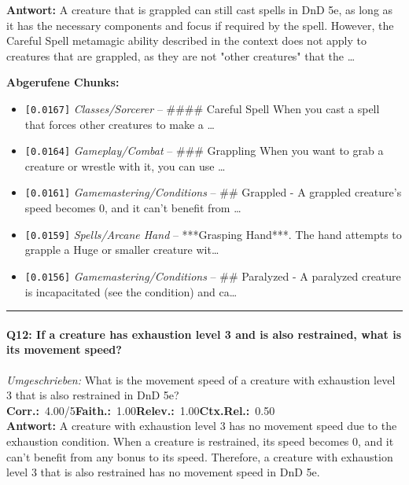 \noindent\textbf{Antwort:} A creature that is grappled can still cast spells in DnD 5e, as long as it has the necessary components and focus if required by the spell. However, the Careful Spell metamagic ability described in the context does not apply to creatures that are grappled, as they are not "other creatures" that the \ldots

\noindent\textbf{Abgerufene Chunks:}
\begin{itemize}[noitemsep, topsep=2pt]
  \item[\textbf{\#1}] \texttt{[0.0167]} \textit{Classes/Sorcerer} -- \#\#\#\# Careful Spell  When you cast a spell that forces other creatures to make a \ldots
  \item[\textbf{\#2}] \texttt{[0.0164]} \textit{Gameplay/Combat} -- \#\#\# Grappling  When you want to grab a creature or wrestle with it, you can use \ldots
  \item[\textbf{\#3}] \texttt{[0.0161]} \textit{Gamemastering/Conditions} -- \#\# Grappled  - A grappled creature's speed becomes 0, and it can't benefit from \ldots
  \item[\textbf{\#4}] \texttt{[0.0159]} \textit{Spells/Arcane Hand} -- ***Grasping Hand***. The hand attempts to grapple a Huge or smaller creature wit\ldots
  \item[\textbf{\#5}] \texttt{[0.0156]} \textit{Gamemastering/Conditions} -- \#\# Paralyzed  - A paralyzed creature is incapacitated (see the condition) and ca\ldots
\end{itemize}
\vspace{4pt}
\hrule
\vspace{6pt}

\paragraph{Q12: If a creature has exhaustion level 3 and is also restrained, what is its movement speed?}
\textit{Umgeschrieben:} What is the movement speed of a creature with exhaustion level 3 that is also restrained in DnD 5e?\\[2pt]
\noindent \textbf{Corr.:}~4.00/5\quad \textbf{Faith.:}~1.00\quad \textbf{Relev.:}~1.00\quad \textbf{Ctx.Rel.:}~0.50\\

\noindent\textbf{Antwort:} A creature with exhaustion level 3 has no movement speed due to the exhaustion condition. When a creature is restrained, its speed becomes 0, and it can't benefit from any bonus to its speed. Therefore, a creature with exhaustion level 3 that is also restrained has no movement speed in DnD 5e.

